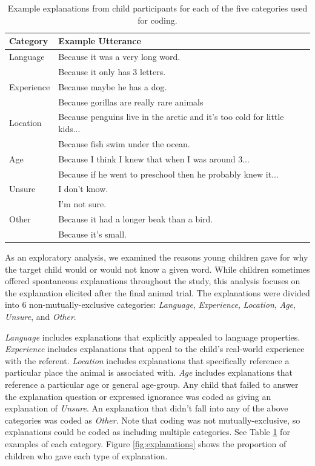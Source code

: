 \documentclass[10pt, letterpaper]{article}
\begin{document}
\begin{table}[tb]
\centering
\begin{tabular}{ll}
  \hline
Category & Example Utterance \\ 
  \hline
Language & Because it was a very long word. \\ 
    & Because it only has 3 letters. \\ 
  Experience & Because maybe he has a dog. \\ 
    & Because gorillas are really rare animals \\ 
  Location & Because penguins live in the arctic and it's too cold for little kids... \\ 
    & Because fish swim under the ocean. \\ 
  Age & Because I think I knew that when I was around 3... \\ 
    & Because if he went to preschool then he probably knew it... \\ 
  Unsure & I don't know. \\ 
    & I'm not sure. \\ 
  Other & Because it had a longer beak than a bird. \\ 
    & Because it's small. \\ 
   \hline
\end{tabular}
\caption{Example explanations from child participants for each of the five categories used for coding.} 
\label{tab:explanations_table}
\end{table}

As an exploratory analysis, we examined the reasons young children gave
for why the target child would or would not know a given word. While
children sometimes offered spontaneous explanations throughout the
study, this analysis focuses on the explanation elicited after the final
animal trial. The explanations were divided into 6
non-mutually-exclusive categories: \emph{Language}, \emph{Experience},
\emph{Location}, \emph{Age}, \emph{Unsure}, and \emph{Other}.

\emph{Language} includes explanations that explicitly appealed to
language properties. \emph{Experience} includes explanations that appeal
to the child's real-world experience with the referent. \emph{Location}
includes explanations that specifically reference a particular place the
animal is associated with. \emph{Age} includes explanations that
reference a particular age or general age-group. Any child that failed
to answer the explanation question or expressed ignorance was coded as
giving an explanation of \emph{Unsure}. An explanation that didn't fall
into any of the above categories was coded as \emph{Other}. Note that
coding was not mutually-exclusive, so explanations could be coded as
including multiple categories. See Table \ref{tab:explanations_table}
for examples of each category. Figure \ref{fig:explanations} shows the
proportion of children who gave each type of explanation.
\end{document}
